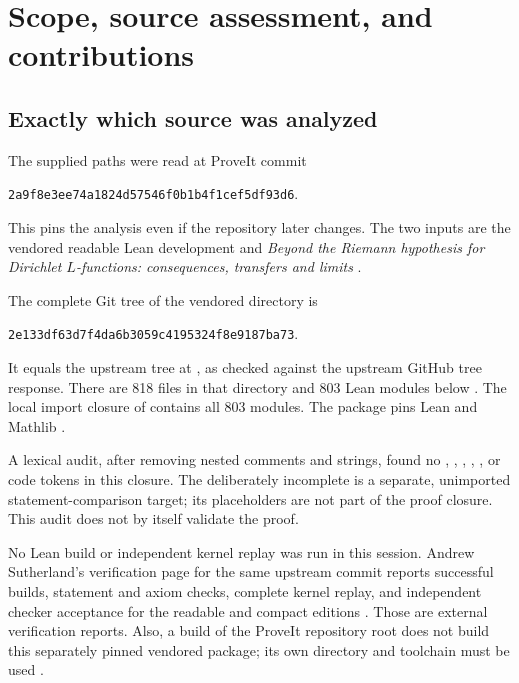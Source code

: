 \section{Scope, source assessment, and contributions}\label{sec:source}

\subsection{Exactly which source was analyzed}

The supplied paths were read at ProveIt commit
\begin{center}
\texttt{2a9f8e3ee74a1824d57546f0b1b4f1cef5df93d6}.
\end{center}
This pins the analysis even if the repository later changes. The two inputs
are the vendored readable Lean development \cite{vendor,sernau} and
\emph{Beyond the Riemann hypothesis for Dirichlet $L$-functions:
consequences, transfers and limits} \cite{article}.

The complete Git tree of the vendored  directory is
\begin{center}
\texttt{2e133df63d7f4da6b3059c4195324f8e9187ba73}.
\end{center}
It equals the upstream  tree at
, as checked against the
upstream GitHub tree response. There are 818 files in that directory and
803 Lean modules below . The local import closure of
 contains all 803 modules. The package pins Lean
 and Mathlib
.

A lexical audit, after removing nested comments and strings, found no
, , , ,
, or  code tokens in this
closure. The deliberately incomplete  is a separate,
unimported statement-comparison target; its placeholders are not part of
the proof closure. This audit does not by itself validate the proof.

No Lean build or independent kernel replay was run in this session.
Andrew Sutherland's verification page for the same upstream commit reports
successful builds, statement and axiom checks, complete kernel replay,
and independent checker acceptance for the readable and compact editions
\cite{sutherland}. Those are external verification reports. Also, a build
of the ProveIt repository root does not build this separately pinned
vendored package; its own directory and toolchain must be used
\cite{vendor}.

